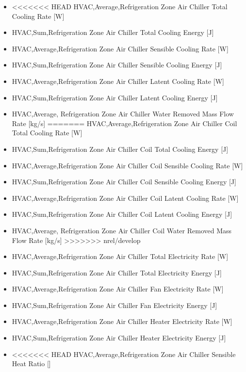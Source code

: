 \begin{itemize}
\item
<<<<<<< HEAD
  HVAC,Average,Refrigeration Zone Air Chiller Total Cooling Rate {[}W{]}
\item
  HVAC,Sum,Refrigeration Zone Air Chiller Total Cooling Energy {[}J{]}
\item
  HVAC,Average,Refrigeration Zone Air Chiller Sensible Cooling Rate {[}W{]}
\item
  HVAC,Sum,Refrigeration Zone Air Chiller Sensible Cooling Energy {[}J{]}
\item
  HVAC,Average,Refrigeration Zone Air Chiller Latent Cooling Rate {[}W{]}
\item
  HVAC,Sum,Refrigeration Zone Air Chiller Latent Cooling Energy {[}J{]}
\item
  HVAC,Average, Refrigeration Zone Air Chiller Water Removed Mass Flow Rate {[}kg/s{]}
=======
  HVAC,Average,Refrigeration Zone Air Chiller Coil Total Cooling Rate {[}W{]}
\item
  HVAC,Sum,Refrigeration Zone Air Chiller Coil Total Cooling Energy {[}J{]}
\item
  HVAC,Average,Refrigeration Zone Air Chiller Coil Sensible Cooling Rate {[}W{]}
\item
  HVAC,Sum,Refrigeration Zone Air Chiller Coil Sensible Cooling Energy {[}J{]}
\item
  HVAC,Average,Refrigeration Zone Air Chiller Coil Latent Cooling Rate {[}W{]}
\item
  HVAC,Sum,Refrigeration Zone Air Chiller Coil Latent Cooling Energy {[}J{]}
\item
  HVAC,Average, Refrigeration Zone Air Chiller Coil Water Removed Mass Flow Rate {[}kg/s{]}
>>>>>>> nrel/develop
\item
  HVAC,Average,Refrigeration Zone Air Chiller Total Electricity Rate {[}W{]}
\item
  HVAC,Sum,Refrigeration Zone Air Chiller Total Electricity Energy {[}J{]}
\item
  HVAC,Average,Refrigeration Zone Air Chiller Fan Electricity Rate {[}W{]}
\item
  HVAC,Sum,Refrigeration Zone Air Chiller Fan Electricity Energy {[}J{]}
\item
  HVAC,Average,Refrigeration Zone Air Chiller Heater Electricity Rate {[}W{]}
\item
  HVAC,Sum,Refrigeration Zone Air Chiller Heater Electricity Energy {[}J{]}
\item
<<<<<<< HEAD
  HVAC,Average,Refrigeration Zone Air Chiller Sensible Heat Ratio {[]}

\end{itemize}
